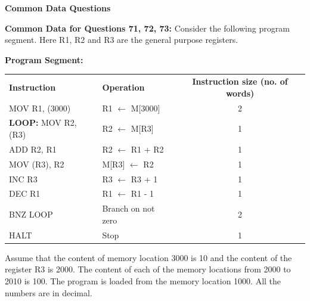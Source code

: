 \documentclass[journal,12pt,onecolumn]{IEEEtran}
\theoremstyle{remark}
\begin{document}
\begin {center}
\begin{enumerate}
\begin{center}
 
\textbf{Common Data Questions}
\end{center}

\textbf{Common Data for Questions 71, 72, 73:}
\newline
Consider the following program segment. Here R1, R2 and R3 are the general purpose registers.


    \textbf{Program Segment:}

    \begin{center}
    \begin{tabular}{l l c}
    
    \textbf{Instruction} & \textbf{Operation} & \textbf{Instruction size (no. of words)} \\ 
    MOV R1, (3000) & R1 $\leftarrow$ M[3000] & 2 \\ 
    \textbf{LOOP:} MOV R2, (R3) & R2 $\leftarrow$ M[R3] & 1 \\ 
    ADD R2, R1 & R2 $\leftarrow$ R1 + R2 & 1 \\ 
    MOV (R3), R2 & M[R3] $\leftarrow$ R2 & 1 \\ 
    INC R3 & R3 $\leftarrow$ R3 + 1 & 1 \\ 
    DEC R1 & R1 $\leftarrow$ R1 - 1 & 1 \\ 
    BNZ LOOP & Branch on not zero & 2 \\ 
    HALT & Stop & 1 \\ 
    \end{tabular}
    \end{center}

     Assume that the content of memory location 3000 is 10 and the content of the register R3 is 2000. The content of each of the memory locations from 2000 to 2010 is 100. The program is loaded from the memory location 1000. All the numbers are in decimal.
    

\end{enumerate}
\end{center}
\end{document}
